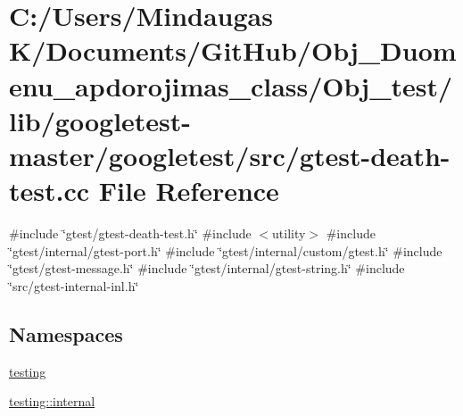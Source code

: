 \hypertarget{_obj__test_2lib_2googletest-master_2googletest_2src_2gtest-death-test_8cc}{}\section{C\+:/\+Users/\+Mindaugas K/\+Documents/\+Git\+Hub/\+Obj\+\_\+\+Duomenu\+\_\+apdorojimas\+\_\+class/\+Obj\+\_\+test/lib/googletest-\/master/googletest/src/gtest-\/death-\/test.cc File Reference}
\label{_obj__test_2lib_2googletest-master_2googletest_2src_2gtest-death-test_8cc}
{\ttfamily \#include \char`\"{}gtest/gtest-\/death-\/test.\+h\char`\"{}}\newline
{\ttfamily \#include $<$utility$>$}\newline
{\ttfamily \#include \char`\"{}gtest/internal/gtest-\/port.\+h\char`\"{}}\newline
{\ttfamily \#include \char`\"{}gtest/internal/custom/gtest.\+h\char`\"{}}\newline
{\ttfamily \#include \char`\"{}gtest/gtest-\/message.\+h\char`\"{}}\newline
{\ttfamily \#include \char`\"{}gtest/internal/gtest-\/string.\+h\char`\"{}}\newline
{\ttfamily \#include \char`\"{}src/gtest-\/internal-\/inl.\+h\char`\"{}}\newline
\subsection*{Namespaces}
\begin{DoxyCompactItemize}
\item 
 \mbox{\hyperlink{namespacetesting}{testing}}
\item 
 \mbox{\hyperlink{namespacetesting_1_1internal}{testing\+::internal}}
\end{DoxyCompactItemize}
